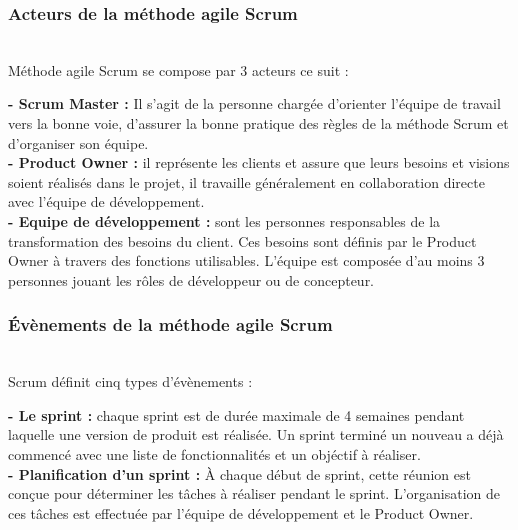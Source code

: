 \subsubsection{\Large    Acteurs de la méthode agile Scrum}
\texttt{}\\[0.1cm]
\textsf{\selectfont{}
Méthode agile Scrum se compose par 3  acteurs ce suit : }\\[0.1cm]
\par \noindent \textbf{\LARGE - Scrum Master : }\textsf{\selectfont{} Il s'agit de la personne chargée d'orienter l'équipe de travail vers la bonne voie, d'assurer la bonne pratique des règles de la méthode Scrum et d'organiser son équipe.} \\[0.1cm]

\noindent \textbf{\LARGE - Product Owner : }\textsf{\selectfont{} il représente les clients et assure que leurs besoins et visions soient réalisés dans le projet, il travaille généralement en collaboration directe avec l’équipe de développement. }\\[0.1cm]

\noindent \textbf{\LARGE - Equipe de développement : }\textsf{\selectfont{}sont les personnes responsables de la transformation des besoins du client. Ces besoins sont définis par le Product Owner à travers des fonctions utilisables. L'équipe est composée d'au moins 3 personnes jouant les rôles de développeur ou de concepteur.}\\[0.1cm]
\subsubsection{\Large Évènements de la méthode agile Scrum }
\texttt{}\\[0.1cm]
\textsf{\selectfont{} Scrum définit cinq types d'évènements :}\\[0.1cm]
\par \noindent \textbf{\LARGE - Le sprint :}\textsf{\selectfont{} chaque sprint est de durée maximale de 4 semaines pendant laquelle une version de produit est réalisée. Un sprint terminé un nouveau a déjà commencé avec une liste de fonctionnalités et un objéctif à réaliser.} \\[0.1cm]

\noindent \textbf{\LARGE - Planification d’un sprint : }\textsf{\selectfont{} À chaque début de sprint, cette réunion est conçue pour déterminer les tâches à réaliser pendant le sprint. L’organisation de ces tâches est effectuée par l’équipe de développement et le Product Owner. }\\[0.1cm]

